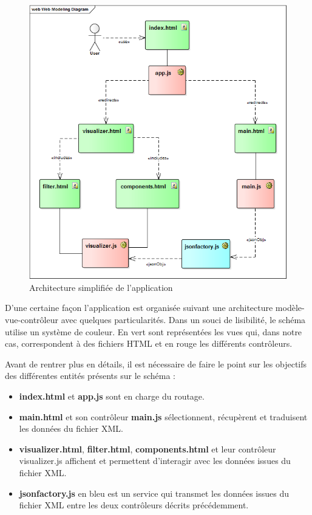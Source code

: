 \documentclass [a4paper,11pt]{article}
\begin{document}
\begin{figure}[!h]
\centering
\includegraphics[scale=0.5]{img/ped_architecture.png}
\caption[Résultats]{Architecture simplifiée de l'application}
\end{figure}
\newline

D’une certaine façon l’application est organisée suivant une architecture modèle-vue-contrôleur avec quelques particularités. Dans un souci de lisibilité, le schéma utilise un système de couleur. En vert sont représentées les vues qui, dans notre cas, correspondent à des fichiers HTML et en rouge les différents contrôleurs.
\newline

Avant de rentrer plus en détails, il est nécessaire de faire le point sur les objectifs des différentes entités présents sur le schéma :
\newline

\begin{itemize}
 \item \textbf{index.html} et \textbf{app.js} sont en charge du routage.
 \item \textbf{main.html} et son contrôleur \textbf{main.js} sélectionnent, récupèrent et traduisent les données du fichier XML.
 \item \textbf{visualizer.html}, \textbf{filter.html}, \textbf{components.html} et leur contrôleur visualizer.js affichent et permettent d’interagir avec les données issues du fichier XML.
 \item \textbf{jsonfactory.js} en bleu est un service qui transmet les données issues du fichier XML entre les deux contrôleurs décrits précédemment.
 \newline
\end{itemize}
\end{document}
